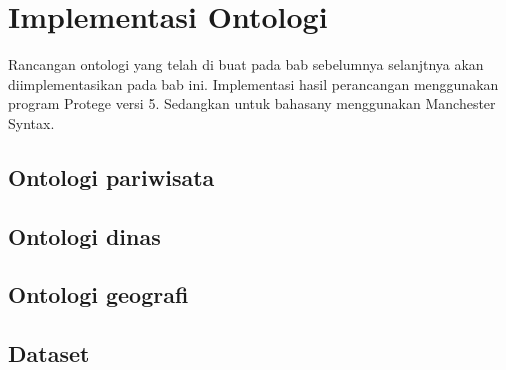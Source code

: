 \section{Implementasi Ontologi}
Rancangan ontologi yang telah di buat pada bab sebelumnya selanjtnya akan diimplementasikan pada bab ini. Implementasi hasil perancangan menggunakan program Protege versi 5. Sedangkan untuk bahasany menggunakan Manchester Syntax.


\subsection{Ontologi pariwisata}

\subsection{Ontologi dinas}
\subsection{Ontologi geografi}
\subsection{Dataset}